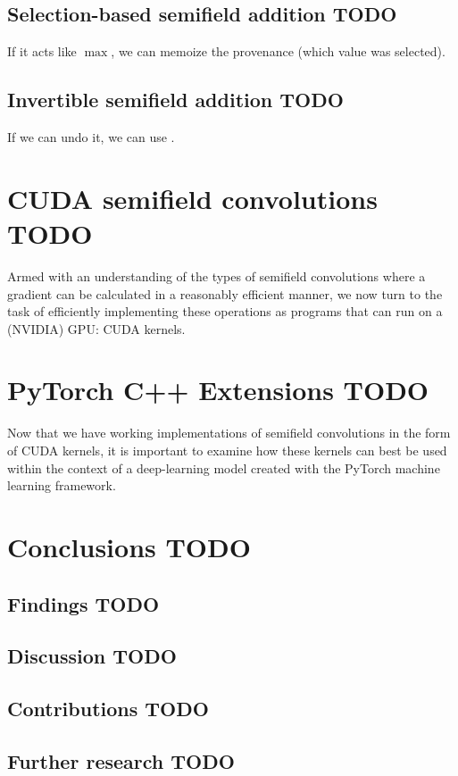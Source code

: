 \documentclass[a4paper, 12pt]{report}
\def\comment#1{\color{red}#1\color{black}}
\begin{document}
\section{Selection-based semifield addition \comment{TODO}}
If it acts like $\max$, we can memoize the provenance (which value was selected).
\section{Invertible semifield addition \comment{TODO}}
If we can undo it, we can use \cite{ppad}.

\chapter{CUDA semifield convolutions \comment{TODO}}
Armed with an understanding of the types of semifield convolutions where a gradient can be calculated in a reasonably efficient manner, we now turn to the task of efficiently implementing these operations as programs that can run on a (NVIDIA) GPU: CUDA kernels.

\chapter{PyTorch C++ Extensions \comment{TODO}}
Now that we have working implementations of semifield convolutions in the form of CUDA kernels, it is important to examine how these kernels can best be used within the context of a deep-learning model created with the PyTorch machine learning framework.

\chapter{Conclusions \comment{TODO}}

\section{Findings \comment{TODO}}
\section{Discussion \comment{TODO}}

\newpage
\section{Contributions \comment{TODO}}
\section{Further research \comment{TODO}}
\end{document}
